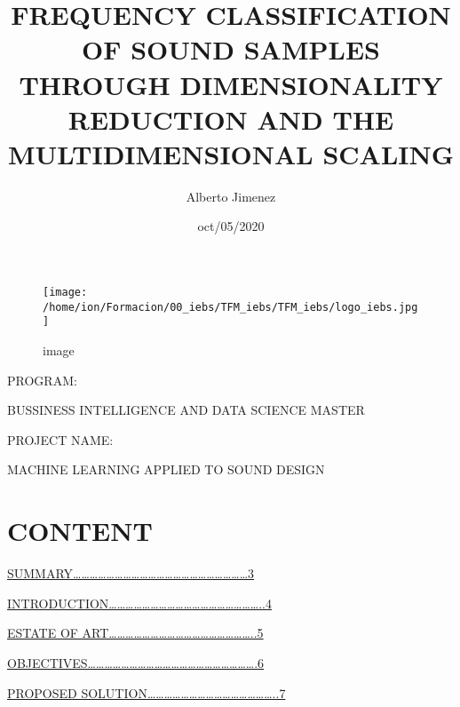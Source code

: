\documentclass[
]{article}
\title{FREQUENCY CLASSIFICATION OF SOUND SAMPLES THROUGH DIMENSIONALITY
REDUCTION AND THE MULTIDIMENSIONAL SCALING}
\author{Alberto Jimenez}
\date{oct/05/2020}
\begin{document}
\maketitle

\begin{figure}
\centering
\texttt{[image: /home/ion/Formacion/00\_iebs/TFM\_iebs/TFM\_iebs/logo\_iebs.jpg]}
\caption{image}
\end{figure}

\vspace{72pt}

PROGRAM:

BUSSINESS INTELLIGENCE AND DATA SCIENCE MASTER

\vspace{20pt}

PROJECT NAME:

MACHINE LEARNING APPLIED TO SOUND DESIGN

\newpage

\hypertarget{content}{%
\section{CONTENT}\label{content}}

\vspace{60pt}

\protect\hyperlink{summary}{SUMMARY\ldots\ldots\ldots\ldots\ldots\ldots\ldots\ldots\ldots\ldots\ldots\ldots\ldots\ldots\ldots\ldots\ldots\ldots\ldots\ldots\ldots3}
\vspace{12pt}

\protect\hyperlink{introduction}{INTRODUCTION\ldots\ldots\ldots\ldots\ldots\ldots\ldots\ldots\ldots\ldots\ldots\ldots\ldots\ldots\ldots\ldots\ldots\ldots..4}
\vspace{12pt}

\protect\hyperlink{state-of-art}{ESTATE OF
ART\ldots\ldots\ldots\ldots\ldots\ldots\ldots\ldots\ldots\ldots\ldots\ldots\ldots\ldots\ldots\ldots\ldots..5}
\vspace{12pt}

\protect\hyperlink{objeCtives}{OBJECTIVES\ldots\ldots\ldots\ldots\ldots\ldots\ldots\ldots\ldots\ldots\ldots\ldots\ldots\ldots\ldots\ldots\ldots\ldots\ldots\ldots.6}
\vspace{12pt}

\protect\hyperlink{proposed-solution}{PROPOSED
SOLUTION\ldots\ldots\ldots\ldots\ldots\ldots\ldots\ldots\ldots\ldots\ldots\ldots\ldots\ldots\ldots..7}
\vspace{12pt}
\end{document}
